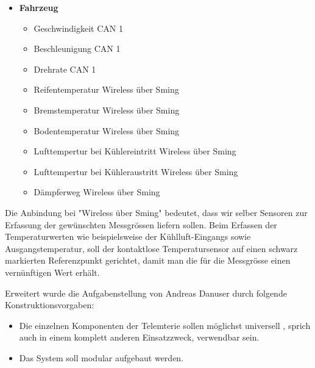 \begin{itemize}
	\item \textbf{Fahrzeug}		
	\begin{itemize}
		\itemsep 1pt \parskip 0pt \parsep 0pt
		\item Geschwindigkeit						CAN 1
		\item Beschleunigung						CAN 1
		\item Drehrate 								CAN 1
		\item Reifentemperatur						Wireless über Sming
		\item Bremstemperatur						Wireless über Sming
		\item Bodentemperatur						Wireless über Sming
		\item Lufttempertur bei Kühlereintritt		Wireless über Sming
		\item Lufttempertur bei Kühleraustritt		Wireless über Sming
		\item Dämpferweg							Wireless über Sming
		
	\end{itemize}			
\end{itemize}

Die Anbindung bei "Wireless über Sming" bedeutet, dass wir selber Sensoren zur Erfassung der gewünschten Messgrössen liefern sollen. Beim Erfassen der Temperaturwerten wie beispielsweise der Kühlluft-Eingangs sowie Ausgangstemperatur, soll der kontaktlose Temperatursensor auf einen schwarz markierten Referenzpunkt gerichtet, damit man die für die Messgrösse einen vernünftigen Wert erhält.


Erweitert wurde die Aufgabenstellung von Andreas Danuser durch folgende Konstruktionsvorgaben:

\begin{itemize}
\itemsep 1pt \parskip 0pt \parsep 0pt
\item Die einzelnen Komponenten der Telemterie sollen möglichst universell , sprich auch in einem komplett anderen Einsatzzweck, verwendbar sein.
\item Das System soll modular aufgebaut werden.

\end{itemize}
